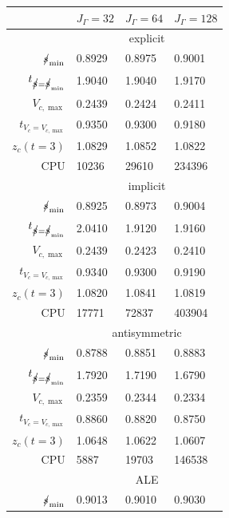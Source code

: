 \begin{table}
\center
\hspace*{-3.25cm}
\begin{tabular}{rlll}
\hline
 & $J_\Gamma=32$ & $J_\Gamma=64$ & $J_\Gamma=128$ \\
\hline
& \multicolumn{3}{c}{explicit} \\
\cmidrule{2-4}
$\mbox{$s\!\!\!\!\:/$}_{\min}$                & 0.8929 & 0.8975 & 0.9001 \\
$t_{\strikes = \strikes_{\min}}$ & 1.9040 & 1.9040 & 1.9170 \\
$V_{c,\max}$                     & 0.2439 & 0.2424 & 0.2411 \\
$t_{V_c = V_{c,\max}}$           & 0.9350 & 0.9300 & 0.9180 \\
$z_c(t=3)$                       & 1.0829 & 1.0852 & 1.0822 \\
CPU                              &  10236 &  29610 & 234396 \\
\cmidrule{2-4}
& \multicolumn{3}{c}{implicit} \\
\cmidrule{2-4}
$\mbox{$s\!\!\!\!\:/$}_{\min}$                & 0.8925 & 0.8973 & 0.9004 \\
$t_{\strikes = \strikes_{\min}}$ & 2.0410 & 1.9120 & 1.9160 \\
$V_{c,\max}$                     & 0.2439 & 0.2423 & 0.2410 \\
$t_{V_c = V_{c,\max}}$           & 0.9340 & 0.9300 & 0.9190 \\
$z_c(t=3)$                       & 1.0820 & 1.0841 & 1.0819 \\
CPU                              &  17771 &  72837 & 403904 \\
\cmidrule{2-4}
& \multicolumn{3}{c}{antisymmetric} \\
\cmidrule{2-4}
$\mbox{$s\!\!\!\!\:/$}_{\min}$                & 0.8788 & 0.8851 & 0.8883 \\
$t_{\strikes = \strikes_{\min}}$ & 1.7920 & 1.7190 & 1.6790 \\
$V_{c,\max}$                     & 0.2359 & 0.2344 & 0.2334 \\
$t_{V_c = V_{c,\max}}$           & 0.8860 & 0.8820 & 0.8750 \\
$z_c(t=3)$                       & 1.0648 & 1.0622 & 1.0607 \\
CPU                              &   5887 &  19703 & 146538 \\
\cmidrule{2-4}
& \multicolumn{3}{c}{ALE} \\
\cmidrule{2-4}
$\mbox{$s\!\!\!\!\:/$}_{\min}$                & 0.9013 & 0.9010 & 0.9030 \\

\end{tabular}
\end{table}
